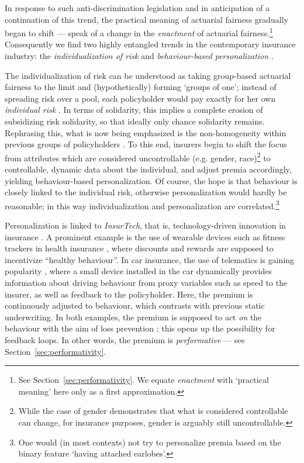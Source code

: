 \documentclass[11pt]{article} %
\makeatletter
\newcommand*{\eg}{e.g.\@\xspace}
\makeatother
\begin{document}
In response to such anti-discrimination legislation and in anticipation of a continuation of this trend, the practical meaning of actuarial fairness gradually began to shift --- \citet{meyers2018enacting} speak of a change in the \textit{enactment} of actuarial fairness.\footnote{See Section~\ref{sec:performativity}. We equate \textit{enactment} with `practical meaning' here only as a first approximation.} Consequently we find two highly entangled trends in the contemporary insurance industry: the \textit{individualization of risk} and \textit{behaviour-based personalization} \citep{cevolini2020pool,mcfall2020personalisation}.

The individualization of risk can be understood as taking group-based actuarial fairness to the limit and (hypothetically) forming `groups of one'; instead of spreading risk over a pool, each policyholder would pay exactly for her own \textit{individual risk} \citep{cevolini2020pool}. In terms of solidarity, this implies a complete erosion of subsidizing risk solidarity, so that ideally only chance solidarity remains. Rephrasing this, what is now being emphasized is the non-homogeneity within previous groups of policyholders \citep{barry2020insurance}.
To this end, insurers begin to shift the focus from attributes which are considered uncontrollable (\eg gender, race)\footnote{While the case of gender demonstrates that what is considered controllable can change, for insurance purposes, gender is arguably still uncontrollable.} to controllable, dynamic data about the individual, and adjust premia accordingly, yielding behaviour-based personalization. Of course, the hope is that behaviour is closely linked to the individual risk, otherwise personalization would hardly be reasonable; in this way individualization and personalization are correlated.\footnote{One would (in most contexts) not try to personalize premia based on the binary feature `having attached earlobes'.} 

Personalization is linked to \textit{InsurTech}, that is, technology-driven innovation in insurance \citep{mcfall2020personalisation}. A prominent example is the use of wearable devices such as fitness trackers in health insurance \citep{lupton2016diverse,mcfall2019personalizing}, where discounts and rewards are supposed to incentivize ``healthy behaviour''. In car insurance, the use of telematics is gaining popularity \citep{verbelen2018unravelling,meyers2018enacting,cevolini2022actuarial}, where a small device installed in the car dynamically provides information about driving behaviour from proxy variables such as speed to the insurer, as well as feedback to the policyholder. Here, the premium is continuously adjusted to behaviour, which contrasts with previous static underwriting. In both examples, the premium is supposed to act \textit{on} the behaviour with the aim of loss prevention \citep{mcfall2018or}; this opens up the possibility for feedback loops. In other words, the premium is \textit{performative} --- see Section~\ref{sec:performativity}.
\end{document}
